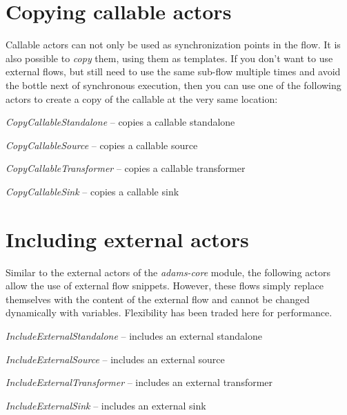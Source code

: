 \documentclass[a4paper]{book}
\begin{document}
\newpage
\chapter{Copying callable actors}
\label{copycallableactors}
Callable actors can not only be used as synchronization points in the flow. It
is also possible to \textit{copy} them, using them as templates. If you don't
want to use external flows, but still need to use the same sub-flow multiple
times and avoid the bottle next of synchronous execution, then you can use
one of the following actors to create a copy of the callable at the very same 
location:
\begin{tight_itemize}
	\item \textit{CopyCallableStandalone} -- copies a callable standalone
	\item \textit{CopyCallableSource} -- copies a callable source
	\item \textit{CopyCallableTransformer} -- copies a callable transformer
	\item \textit{CopyCallableSink} -- copies a callable sink
\end{tight_itemize}

\newpage
\chapter{Including external actors}
\label{includeexteranlactors}
Similar to the external actors of the \textit{adams-core} module, the following
actors allow the use of external flow snippets. However, these flows simply
replace themselves with the content of the external flow and cannot be changed
dynamically with variables. Flexibility has been traded here for performance.
\begin{tight_itemize}
	\item \textit{IncludeExternalStandalone} -- includes an external standalone
	\item \textit{IncludeExternalSource} -- includes an external source
	\item \textit{IncludeExternalTransformer} -- includes an external transformer
	\item \textit{IncludeExternalSink} -- includes an external sink
\end{tight_itemize}



\end{document}
